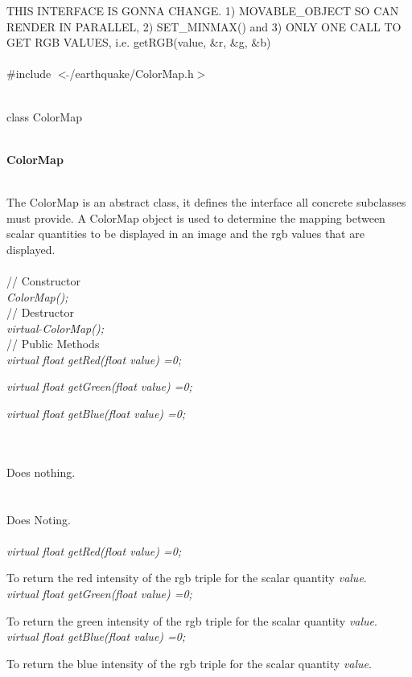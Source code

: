 
THIS INTERFACE IS GONNA CHANGE. 1) MOVABLE\_OBJECT SO CAN RENDER IN
PARALLEL, 2) SET\_MINMAX() and 3) ONLY ONE CALL TO GET RGB VALUES, i.e.
getRGB(value, \&r, \&g, \&b) \\

   \\
\#include $<\tilde{ }$/earthquake/ColorMap.h$>$  


  \\
class ColorMap   


 \\
{\bf ColorMap} 


 \\ 
\indent 
The ColorMap is an abstract class, it defines the interface all
concrete subclasses must provide. A ColorMap object is used to
determine the mapping between scalar quantities to be displayed in an
image and the rgb values that are displayed. \\

 \\
\indent // Constructor \\ 
{\em ColorMap();}\\ 

\indent // Destructor \\ 
{\em virtual $\tilde{ }$ColorMap();}\\  

\indent // Public Methods\\ 
{\em virtual float getRed(float value) =0;}

{\em virtual float getGreen(float value) =0;}

{\em virtual float getBlue(float value) =0;}


 \\ 
\\ 
Does nothing. \\

 \\
\\  
Does Noting. \\

 \\
{\em virtual float getRed(float value) =0;}

To return the red intensity of the rgb triple for the scalar quantity
{\em value}. \\

{\em virtual float getGreen(float value) =0;}

To return the green intensity of the rgb triple for the scalar quantity
{\em value}. \\

{\em virtual float getBlue(float value) =0;}

To return the blue intensity of the rgb triple for the scalar quantity
{\em value}. \\